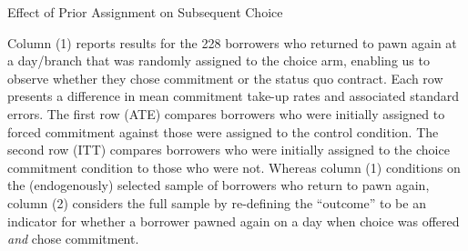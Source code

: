 \vspace{.1in}
\begin{table}[H]
        \caption{Effect of Prior Assignment on Subsequent Choice}
    \label{learning_table}
\begin{center}
\scriptsize{}
\end{center}
 \scriptsize  


Column (1) reports results for the 228 borrowers who returned to pawn again at a day/branch that was randomly assigned to the choice arm, enabling us to observe whether they chose commitment or the status quo contract.
Each row presents a difference in mean commitment take-up rates and associated standard errors.
The first row (ATE) compares borrowers who were initially assigned to forced commitment against those were assigned to the control condition.
The second row (ITT) compares borrowers who were initially assigned to the choice commitment condition to those who were not.
Whereas column (1) conditions on the (endogenously) selected sample of borrowers who return to pawn again, column (2) considers the full sample by re-defining the ``outcome'' to be an indicator for whether a borrower pawned again on a day when choice was offered \emph{and} chose commitment.


\end{table}




\vspace{.3in}

